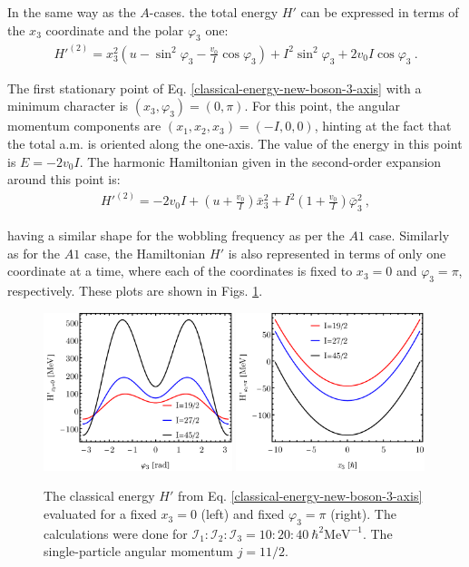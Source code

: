 In the same way as the $A$-cases. the total energy $H'$ can be expressed in terms of the $x_3$ coordinate and the polar $\varphi_3$ one:
\begin{align}
    H'^{(2)}=x_3^2\left(u-\sin^2\varphi_3-\frac{v_0}{I}\cos\varphi_3\right)+I^2\sin^2\varphi_3+2v_0I\cos\varphi_3\ .
    \label{classical-energy-new-boson-3-axis}
\end{align}

The first stationary point of Eq. \ref{classical-energy-new-boson-3-axis} with a minimum character is $(x_3,\varphi_3)=(0,\pi)$. For this point, the angular momentum components are $(x_1,x_2,x_3)=(-I,0,0)$, hinting at the fact that the total a.m. is oriented along the one-axis. The value of the energy in this point is $E=-2v_0I$. The harmonic Hamiltonian given in the second-order expansion around this point is:
\begin{align}
    H'^{(2)}=-2v_0I+\left(u+\frac{v_0}{I}\right)\bar{x}_3^2+I^2\left(1+\frac{v_0}{I}\right)\bar{\varphi}_3^2\ ,
\end{align}

having a similar shape for the wobbling frequency as per the $A1$ case. Similarly as for the $A1$ case, the Hamiltonian $H'$ is also represented in terms of only one coordinate at a time, where each of the coordinates is fixed to $x_3=0$ and $\varphi_3=\pi$, respectively. These plots are shown in Figs. \ref{energy-function-comparison-b1-case}.
\begin{figure}
    \centering
    \includegraphics[width=0.49\textwidth]{Chapters/Figures/Energy-Function-New-Boson-B1-x3-const.pdf}
    \includegraphics[width=0.49\textwidth]{Chapters/Figures/Energy-Function-New-Boson-B1-phi3-const.pdf}
    \caption{The classical energy $H'$ from Eq. \ref{classical-energy-new-boson-3-axis} evaluated for a fixed $x_3=0$ (left) and fixed $\varphi_3=\pi$ (right). The calculations were done for $\mathcal{I}_1:\mathcal{I}_2:\mathcal{I}_3=10:20:40\ \hbar^2\text{MeV}^{-1}$. The single-particle angular momentum $j=11/2$.}
    \label{energy-function-comparison-b1-case}
\end{figure}

